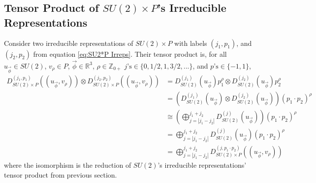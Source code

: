 \documentclass[preprint, 12pt]{revtex4-2}
\numberwithin{equation}{section}
\begin{document}
\subsection{Tensor Product of $SU(2)\times P$'s Irreducible Representations}
Consider two irreducible representations of $SU(2)\times P$ with labels $(j_1, p_1)$, and $(j_2, p_2)$ from equation \ref{eq:SU2*P Irreps}. Their tensor product is, for all $u_{\vec{\phi}}\in SU(2)$, $v_\rho \in P$, $\vec{\phi}\in\mathbb{R}^3$, $\rho\in\mathbb{Z}_{0+}$ $j\text{'s}\in\{0, 1/2, 1, 3/2, ...\}$, and $p\text{'s}\in\{-1, 1\}$,
\begin{equation}
    \begin{aligned}
        D_{SU(2)\times P}^{(j_1,p_1)}((u_{\vec{\phi}}, v_\rho))\otimes D_{SU(2)\times P}^{(j_2,p_2)}((u_{\vec{\phi}}, v_\rho)) 
        &= D^{(j_1)}_{SU(2)}(u_{\vec{\phi}})p_1^\rho \otimes D^{(j_2)}_{SU(2)}(u_{\vec{\phi}})p_2^\rho \\
        &= \left(D^{(j_1)}_{SU(2)}(u_{\vec{\phi}}) \otimes D^{(j_2)}_{SU(2)}(u_{\vec{\phi}})\right)(p_1\cdot p_2)^\rho \\
        &\cong \left(\bigoplus_{j=|j_1-j_2|}^{j_1+j_2}D^{(j)}_{SU(2)}(u_{\vec{\phi}})\right)(p_1\cdot p_2)^\rho \\
        &= \bigoplus_{j=|j_1-j_2|}^{j_1+j_2}D^{(j)}_{SU(2)}(u_{\vec{\phi}})(p_1\cdot p_2)^\rho \\
        &= \bigoplus_{j=|j_1-j_2|}^{j_1+j_2}D_{SU(2)\times P}^{(j,p_1\cdot p_2)}((u_{\vec{\phi}}, v_\rho))
    \end{aligned}
\end{equation}
where the isomorphism is the reduction of $SU(2)$'s irreducible representations' tensor product from previous section.
\end{document}
